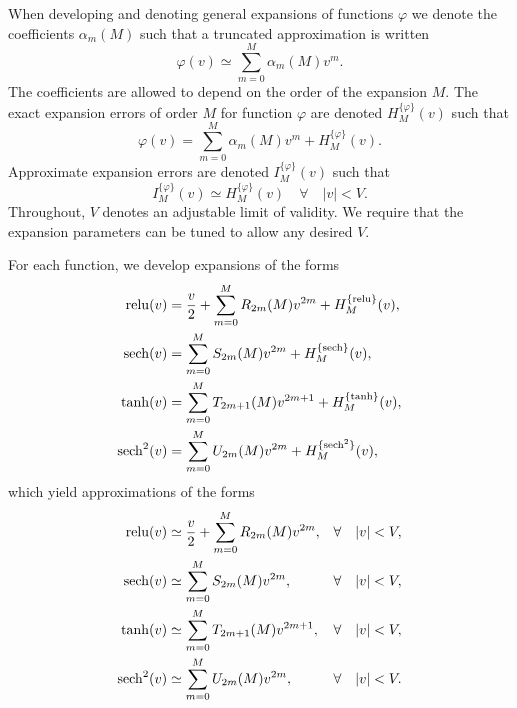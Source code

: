 When developing and denoting general expansions of functions $\varphi$
we denote the coefficients $\alpha_m(M)$ such that a truncated approximation
is written
\begin{equation}
	\label{eq_alpha_expansion}
	\varphi(v) \simeq \sum_{m=0}^{M} \alpha_m(M) v^m.
\end{equation}
The coefficients are allowed to depend on the order of the expansion $M$.
The exact expansion errors of order $M$ for function $\varphi$ are denoted $H_M^{\{\varphi\}}(v)$
such that
\begin{equation}
	\label{eq_alpha_expansion_with_eta_error}
	\varphi(v) = \sum_{m=0}^{M} \alpha_m(M) v^m + H_M^{\{\varphi\}}(v).
\end{equation}
Approximate expansion errors are denoted $I_M^{\{\varphi\}}(v)$ such that
\begin{equation}
	I_M^{\{\varphi\}}(v) \simeq H_M^{\{\varphi\}}(v) \quad \forall \quad |v| < V.
\end{equation}
Throughout, $V$ denotes an adjustable limit of validity.  We require that the expansion
parameters can be tuned to allow any desired $V$.

For each function, we develop expansions of the forms
\begin{align}
	\operatorname{relu}(v) &= \frac{v}{2} + \sum_{m=0}^{M} R_{2m}(M) v^{2m} + H_M^{\{\operatorname{relu}\}}(v), \\
	\operatorname{sech}(v) &= \sum_{m=0}^{M} S_{2m}(M) v^{2m} + H_M^{\{\operatorname{sech}\}}(v), \\
	\tanh(v) &= \sum_{m=0}^{M} T_{2m+1}(M) v^{2m+1} + H_M^{\{\tanh\}}(v), \\
	\operatorname{sech}^2(v) &= \sum_{m=0}^{M} U_{2m}(M) v^{2m} + H_M^{\{\operatorname{sech}^2\}}(v), \label{eq_sech2_exp_exact_form}
\end{align}
which yield approximations of the forms
\begin{align}
	\operatorname{relu}(v) &\simeq \frac{v}{2} + \sum_{m=0}^{M} R_{2m}(M) v^{2m} ,
	    &\forall \quad |v| < V , \label{eq_relu_exp_approx_form} \\
	\operatorname{sech}(v) &\simeq \sum_{m=0}^{M} S_{2m}(M) v^{2m} ,
	    &\forall \quad |v| < V , \label{eq_sech_exp_approx_form} \\
	\tanh(v) &\simeq \sum_{m=0}^{M} T_{2m+1}(M) v^{2m+1} , 
	    &\forall \quad |v| < V , \label{eq_tanh_exp_approx_form} \\
	\operatorname{sech}^2(v) &\simeq \sum_{m=0}^{M} U_{2m}(M) v^{2m} , 
	    &\forall \quad |v| < V . \label{eq_sech2_exp_approx_form}
\end{align}

